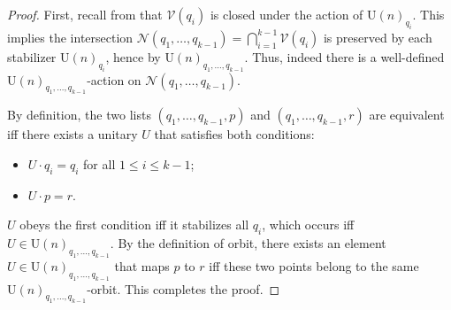 \documentclass[10pt,a4paper]{amsart}
\begin{document}
\begin{proof}
	First, recall from  that $ \mathcal{V} \left( q_i \right) $ is closed under the action of $ \mathrm{U} \left( n \right)_{q_i} $. This implies the intersection $\mathcal{N} \left( q_1, \ldots, q_{k-1} \right) = \bigcap_{i=1}^{k-1} \mathcal{V} \left( q_i \right) $ is preserved by each stabilizer $ \mathrm{U} \left( n \right)_{q_i} $, hence by $\mathrm{U} \left( n \right)_{q_1, \ldots, q_{k-1} }$. Thus, indeed there is a well-defined $\mathrm{U} \left( n \right)_{q_1, \ldots, q_{k-1} }$-action on $ \mathcal{N} \left( q_1, \ldots, q_{k-1} \right) $.

	By definition, the two lists $ \left( q_1, \ldots, q_{k-1}, p \right) $ and $ \left( q_1, \ldots, q_{k-1}, r \right) $ are equivalent iff there exists a unitary $U$ that satisfies both conditions: 
	\begin{itemize}
		\item $ U \cdot q_i = q_i $ for all $1 \leq i \leq k-1$;
		\item $U \cdot p = r$.
	\end{itemize}
	$U$ obeys the first condition iff it stabilizes all $q_i$, which occurs iff $ U \in \mathrm{U} \left( n \right)_{q_1, \ldots, q_{k-1} } $.
	By the definition of orbit, there exists an element $U \in \mathrm{U} \left( n \right)_{q_1, \ldots, q_{k-1} }$ that maps $p$ to $r$ iff these two points belong to the same $\mathrm{U} \left( n \right)_{q_1, \ldots, q_{k-1} }$-orbit. This completes the proof.
\end{proof}
\end{document}
